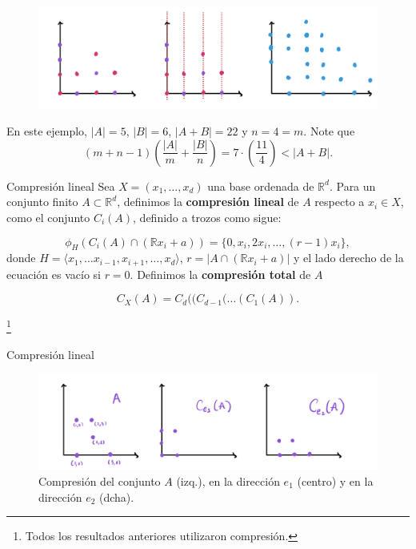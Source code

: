 \documentclass{beamer}
\newcommand\blfootnote[1]{%
  \begingroup
  \renewcommand\thefootnote{}\footnote{#1}%
  \addtocounter{footnote}{-1}%
  \endgroup
}
\begin{document}
\begin{frame}{}
    \begin{figure}
        \centering
        \includegraphics[scale=0.15]{pics/gryn.jpeg}
    \end{figure}

    En este ejemplo, $\lvert A \rvert = 5$, $\lvert B \rvert = 6$, $\lvert A + B \rvert = 22$  y $n = 4 = m$. Note que 
    \begin{equation*}
        (m+n-1) \left( \frac{\lvert A \rvert}{m} + \frac{\lvert B \rvert}{n} \right) = 7\cdot \left(\frac{11}{4}\right) < \lvert A + B \rvert. 
    \end{equation*}
\end{frame}


\begin{frame}{Compresión lineal}
    Sea $X = (x_1, \ldots, x_d)$ una base ordenada de $\mathbb R^d$. Para un conjunto finito $A \subset \mathbb R^d$, definimos la \textbf{compresión lineal} de $A$ respecto a $x_i \in X$, como el conjunto $C_i(A)$, definido a trozos como sigue:

    $$\phi_{H}(C_i(A) \cap (\mathbb R x_i + a )) = \{0, x_i, 2x_i, \ldots, (r-1) x_i\},$$
    donde $H = \langle x_1, \ldots x_{i-1}, x_{i+1}, \ldots, x_d \rangle$, $r = \lvert A \cap (\mathbb R x_i + a) \rvert$ y el lado derecho de la ecuación es vacío si $r=0.$ Definimos la \textbf{compresión total} de $A$

    $$C_X(A) = C_d((C_{d-1}(\ldots (C_1(A)).$$

    \blfootnote{Todos los resultados anteriores utilizaron compresión.}
\end{frame}


\begin{frame}{Compresión lineal}
    \begin{figure}
        \centering
        \includegraphics[scale=0.16]{pics/compresion.jpeg}
        \caption{Compresión del conjunto $A$ (izq.), en la dirección $e_1$ (centro) y en la dirección $e_2$ (dcha).}
    \end{figure}
\end{frame}
\end{document}
